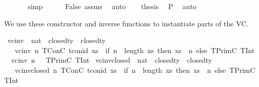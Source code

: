 \begin{isabellebody}
\ \ \ \ \ \isamarkupfalse%
\ simp\isanewline
\ \ \ \ \isamarkupfalse%
\ False\ assms\ \isamarkupfalse%
\ auto\isanewline
\ \ \isamarkupfalse%
\ {\isacharquery}{\kern0pt}thesis\ \isamarkupfalse%
\ {\isacartoucheopen}{\isasymnot}P{\isacartoucheclose}\ \isamarkupfalse%
\ auto\isanewline
{}\isamarkupfalse%
%
\endisatagproof
{\isafoldproof}%
%
\isadelimproof
\isanewline
%
\endisadelimproof
\isanewline
{}\isamarkupfalse%
%
\isadelimdocument
%
\endisadelimdocument
%
\isatagdocument
%
\isamarkuptrue%
%
\endisatagdocument
{\isafolddocument}%
%
\isadelimdocument
%
\endisadelimdocument
%
\begin{isamarkuptext}%
We use these constructor and inverse functions to instantiate parts of the VC.%
\end{isamarkuptext}\isamarkuptrue%
\isamarkupfalse%
\ vc{\isacharunderscore}{\kern0pt}inv\ {\isacharcolon}{\kern0pt}{\isacharcolon}{\kern0pt}\ {\isachardoublequoteopen}nat\ {\isasymRightarrow}\ closed{\isacharunderscore}{\kern0pt}ty\ {\isasymRightarrow}\ closed{\isacharunderscore}{\kern0pt}ty{\isachardoublequoteclose}\isanewline
\ \ \isanewline
\ \ \ {\isachardoublequoteopen}vc{\isacharunderscore}{\kern0pt}inv\ n\ {\isacharparenleft}{\kern0pt}TConC\ tcon{\isacharunderscore}{\kern0pt}id\ xs{\isacharparenright}{\kern0pt}\ {\isacharequal}{\kern0pt}\ {\isacharparenleft}{\kern0pt}if\ n\ {\isacharless}{\kern0pt}\ length\ xs\ then\ xs\ {\isacharbang}{\kern0pt}\ n\ else\ TPrimC\ {\isacharparenleft}{\kern0pt}TInt{\isacharparenright}{\kern0pt}{\isacharparenright}{\kern0pt}{\isachardoublequoteclose}\ \isanewline
\ {\isacharbar}{\kern0pt}\ {\isachardoublequoteopen}vc{\isacharunderscore}{\kern0pt}inv\ n\ {\isacharunderscore}{\kern0pt}\ {\isacharequal}{\kern0pt}\ TPrimC\ {\isacharparenleft}{\kern0pt}TInt{\isacharparenright}{\kern0pt}{\isachardoublequoteclose}\isanewline
\isanewline
{}\isamarkupfalse%
\ vc{\isacharunderscore}{\kern0pt}inv{\isacharunderscore}{\kern0pt}closed\ {\isacharcolon}{\kern0pt}{\isacharcolon}{\kern0pt}\ {\isachardoublequoteopen}nat\ {\isasymRightarrow}\ closed{\isacharunderscore}{\kern0pt}ty\ {\isasymRightarrow}\ closed{\isacharunderscore}{\kern0pt}ty{\isachardoublequoteclose}\isanewline
\ \ \isanewline
\ \ \ {\isachardoublequoteopen}vc{\isacharunderscore}{\kern0pt}inv{\isacharunderscore}{\kern0pt}closed\ n\ {\isacharparenleft}{\kern0pt}TConC\ tcon{\isacharunderscore}{\kern0pt}id\ xs{\isacharparenright}{\kern0pt}\ {\isacharequal}{\kern0pt}\ {\isacharparenleft}{\kern0pt}if\ {\isacharparenleft}{\kern0pt}n\ {\isacharless}{\kern0pt}\ length\ xs{\isacharparenright}{\kern0pt}\ then\ xs\ {\isacharbang}{\kern0pt}\ n\ else\ TPrimC\ {\isacharparenleft}{\kern0pt}TInt{\isacharparenright}{\kern0pt}{\isacharparenright}{\kern0pt}{\isachardoublequoteclose}\ \isanewline

\end{isabellebody}
